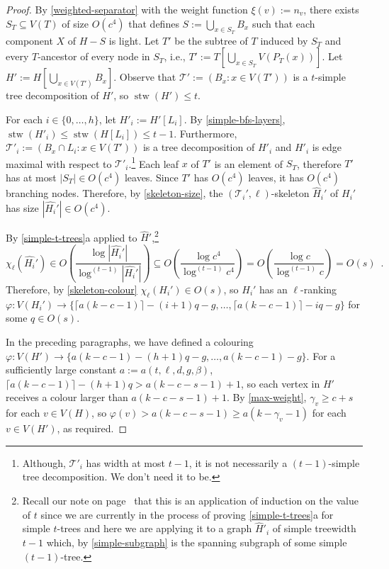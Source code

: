 \documentclass[kpfonts]{patmorin}
\DeclareMathOperator{\stw}{stw}
\newcommand{\lrn}{\chi_{\ell}}
\theoremstyle{named}
\newcommand{\weirdref}[2]{\cref{#1}#2}
\begin{document}
\begin{proof}
    By \cref{weighted-separator} with the weight function $\xi(v):=n_v$, there exists $S_T\subseteq V(T)$ of size $O(c^4)$ that defines $S:=\bigcup_{x\in S_T} B_x$ such that each component $X$ of $H-S$ is light.  Let $T'$ be the subtree of $T$ induced by $S_T$ and every $T$-ancestor of every node in $S_T$, i.e., $T':=T[\bigcup_{x\in S_T} V(P_T(x))]$. Let $H':=H[\bigcup_{x\in V(T')} B_x]$.  Observe that $\mathcal{T'}:=(B_x:x\in V(T'))$ is a $t$-simple tree decomposition of $H'$, so $\stw(H')\le t$.

    For each $i\in\{0,\ldots,h\}$, let $H'_i:=H'[L_i]$.  By \cref{simple-bfs-layers},  $\stw(H'_i)\le\stw(H[L_i])\le t-1$.  Furthermore, $\mathcal{T}'_i:=(B_x\cap L_i: x\in V(T'))$ is a tree decomposition of $H'_i$ and $H'_i$ is edge maximal with respect to $\mathcal{T}'_i$.\footnote{Although, $\mathcal{T}'_i$ has width at most $t-1$, it is not necessarily a $(t-1)$-simple tree decomposition. We don't need it to be.}  Each leaf $x$ of $T'$ is an element of $S_T$, therefore $T'$ has at most $|S_T|\in O(c^4)$ leaves. Since $T'$ has $O(c^4)$ leaves, it has $O(c^4)$ branching nodes.  Therefore, by \cref{skeleton-size}, the $(\mathcal{T}_i',\ell)$-skeleton $\hat{H}_i'$ of $H_i'$ has size $|\hat{H_i}'|\in O(c^4)$.

    By \weirdref{simple-t-trees}{a} applied to $\hat{H}'$,\footnote{Recall our note on page~\pageref{induction-note} that this is an application of induction on the value of $t$ since we are currently in the process of proving \weirdref{simple-t-trees}{a} for simple $t$-trees and here we are applying it to a graph $\hat{H}'_i$ of simple treewidth $t-1$ which, by \cref{simple-subgraph} is the spanning subgraph of some simple $(t-1)$-tree.}
    \[
       \lrn(\hat{H_i}')\in
       O\left(\frac{\log|\hat{H_i}'|}{\log^{(t-1)}|\hat{H_i}'|}\right)
       \subseteq O\left(\frac{\log c^4}{\log^{(t-1)} c^4}\right)
       = O\left(\frac{\log c}{\log^{(t-1)} c}\right)
       = O(s) \enspace .
    \]
    Therefore, by \cref{skeleton-colour} $\lrn(H_i')\in O(s)$, so
    $H_i'$ has an $\ell$-ranking $\varphi:V(H_i')\to \{\lceil a(k-c-1)\rceil-(i+1)q-g,\ldots,\lceil a(k-c-1)\rceil-iq-g\}$ for some $q\in O(s)$.

    In the preceding paragraphs, we have defined a colouring $\varphi: V(H')\to \{a(k-c-1)-(h+1)q-g,\ldots,a(k-c-1)-g\}$.    For a sufficiently large constant $a:=a(t,\ell,d,g,\beta)$, $\lceil a(k-c-1)\rceil-(h+1)q >  a(k-c-s-1)+1$, so each vertex in $H'$ receives a colour larger than $a(k-c-s-1)+1$. By \cref{max-weight}, $\gamma_v\ge c+s$ for each $v\in V(H)$, so $\varphi(v)> a(k-c-s-1) \ge a(k-\gamma_v-1)$ for each $v\in V(H')$, as required.


\end{proof}
\end{document}

